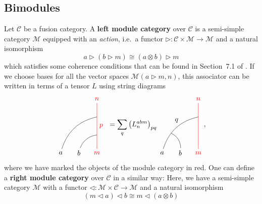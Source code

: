 
\subsection{Bimodules}

\begin{definition}
	Let $\mathcal{C}$ be a fusion category. A \textbf{left module category} over $\mathcal{C}$ is a semi-simple category $\mathcal{M}$ equipped with an \emph{action}, i.e.\ a functor $\triangleright:\mathcal{C}\times\mathcal{M}\to\mathcal{M}$ and a natural isomorphism 
		\begin{equation}
			a\triangleright(b\triangleright m)\cong(a\otimes b)\triangleright m
		\end{equation}
	which satisfies some coherence conditions that can be found in Section~7.1 of \cite{Etingof2015}. If we choose bases for all the vector spaces $\mathcal{M}(a\triangleright m,n)$, this associator can be written in terms of a tensor $L$ using string diagrams
		\begin{equation}
			\begin{tikzpicture}[scale=0.9,baseline=(current bounding box.center)]
			\node[red](m) at (0,0) {$m$};
			\node(b) at (-1,0) {$b$};
			\node(a) at (-2,0) {$a$};
			\node[red](abm) at (0,3) {$n$};
			\draw[red] (m) to node[right] {$p$} (abm);
			\draw (b) to [bend left] (0,1);
			\draw (a) to [bend left] (0,2);
			\end{tikzpicture}\ =\sum_q \left(L_n^{abm}\right)_{pq}
			\begin{tikzpicture}[scale=0.9,baseline=(current bounding box.center)]
			\node[red](m) at (0,0) {$m$};
			\node(b) at (-1,0) {$b$};
			\node(a) at (-2,0) {$a$};
			\node[red](abm) at (0,3) {$n$};
			\node(ab) at (-1.2,1.8) {$q$};
			\draw[red] (m) to (abm);
			\draw (b) to [bend right] (-1.5,1.1);
			\draw (a) to [bend left] (0,2);
			\end{tikzpicture},
		\end{equation}
	where we have marked the objects of the module category in red. One can define a \textbf{right module category} over $\mathcal{C}$ in a similar way: Here, we have a semi-simple category $\mathcal{M}$ with a functor $\triangleleft:\mathcal{M}\times\mathcal{C}\to\mathcal{M}$ and a natural isomorphism
		\begin{equation}
			(m\triangleleft a)\triangleleft b\cong m\triangleleft(a\otimes b)
		\end{equation}

\end{definition}

